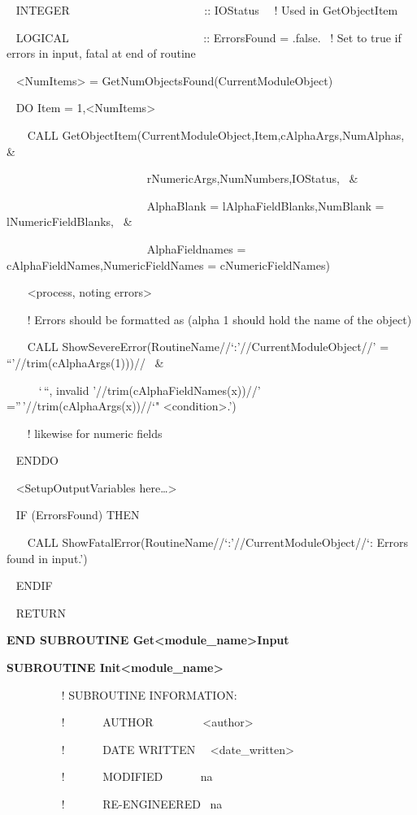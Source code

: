 ~ INTEGER~~~~~~~~~~~~~~~~~~~~~~~ :: IOStatus~~ ! Used in GetObjectItem

~ LOGICAL~~~~~~~~~~~~~~~~~~~~~~~ :: ErrorsFound = .false.~ ! Set to true if errors in input, fatal at end of routine

~ \textless{}NumItems\textgreater{} = GetNumObjectsFound(CurrentModuleObject)

~ DO Item = 1,\textless{}NumItems\textgreater{}

~~~ CALL GetObjectItem(CurrentModuleObject,Item,cAlphaArgs,NumAlphas, \&

~~~~~~~~~~~~~~~~~~~~~~~~ rNumericArgs,NumNumbers,IOStatus,~ \&

~~~~~~~~~~~~~~~~~~~~~~~~ AlphaBlank = lAlphaFieldBlanks,NumBlank = lNumericFieldBlanks,~ \&

~~~~~~~~~~~~~~~~~~~~~~~~ AlphaFieldnames = cAlphaFieldNames,NumericFieldNames = cNumericFieldNames)

~~~ \textless{}process, noting errors\textgreater{}

~~~ ! Errors should be formatted as (alpha 1 should hold the name of the object)

~~~ CALL ShowSevereError(RoutineName//`:'//CurrentModuleObject//' = ``'//trim(cAlphaArgs(1)))//~ \&

~~~~~ `\,``, invalid '//trim(cAlphaFieldNames(x))//' =''\,'//trim(cAlphaArgs(x))//`" \textless{}condition\textgreater{}.')

~~~ ! likewise for numeric fields

~ ENDDO

~ \textless{}SetupOutputVariables here\ldots{}\textgreater{}

~ IF (ErrorsFound) THEN

~~~ CALL ShowFatalError(RoutineName//`:'//CurrentModuleObject//`: Errors found in input.')

~ ENDIF

~ RETURN

\textbf{END SUBROUTINE Get\textless{}module\_name\textgreater{}Input}

\textbf{SUBROUTINE Init\textless{}module\_name\textgreater{}}

~~~~~~~~~ ! SUBROUTINE INFORMATION:

~~~~~~~~~ !~~~~~~ AUTHOR~~~~~~~~ \textless{}author\textgreater{}

~~~~~~~~~ !~~~~~~ DATE WRITTEN~~ \textless{}date\_written\textgreater{}

~~~~~~~~~ !~~~~~~ MODIFIED~~~~~~ na

~~~~~~~~~ !~~~~~~ RE-ENGINEERED~ na

